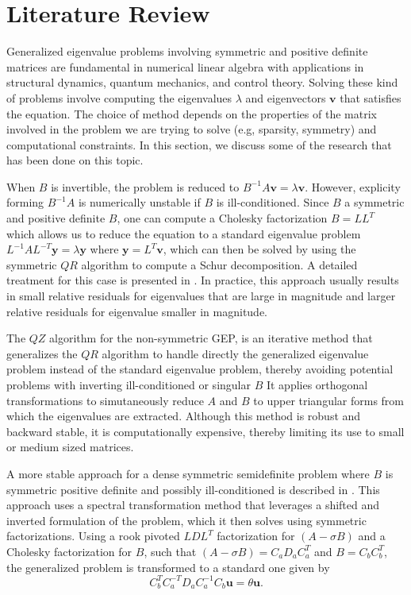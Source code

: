 \section{Literature Review}\label{sec:LiteratureReview}
Generalized eigenvalue problems involving symmetric and positive definite matrices are fundamental in numerical linear algebra with applications in structural  dynamics, quantum mechanics, and control theory. Solving these kind of problems involve computing the eigenvalues $\lambda$ and eigenvectors $\mathbf{v}$ that satisfies the equation. The choice of method depends on the properties of the matrix involved in the problem we are trying to solve (e.g, sparsity, symmetry) and computational constraints. In this section, we discuss some of the research that has been done on this topic.

When $B$ is invertible, the problem is reduced to $B^{-1}A\mathbf{v} = \lambda \mathbf{v}$. However, explicity forming $B^{-1}A$ is numerically unstable if $B$ is ill-conditioned. Since $B$ a symmetric and positive definite $B$, one can compute a Cholesky factorization $B = LL^{T}$ which allows us to reduce the equation to a standard eigenvalue problem $L^{-1}AL^{-T}\mathbf{y} = \lambda \mathbf{y}$ where $\mathbf{y}= L^T \mathbf{v}$, which can then be solved by using the symmetric $QR$ algorithm to compute a Schur decomposition. A detailed treatment for this case is presented in \cite{doi:10.1137/1.9781421407944}. In practice, this approach usually results in small relative residuals for eigenvalues that are large in magnitude and larger relative residuals for eigenvalue smaller in magnitude.

The $QZ$ algorithm \cite{5b3d5fb1-4813-3046-9331-a730b392f611} for the non-symmetric GEP, is an iterative method that generalizes the $QR$ algorithm to handle directly the generalized eigenvalue problem instead of the standard eigenvalue problem, thereby avoiding potential problems with inverting ill-conditioned or singular $B$ It applies orthogonal transformations to simutaneously reduce $A$ and $B$ to upper triangular forms from which the eigenvalues are extracted. Although this method is robust and backward stable, it is computationally expensive, thereby limiting its use to small or medium sized matrices.

A more stable approach for a dense symmetric semidefinite problem where $B$ is symmetric positive definite and possibly ill-conditioned is described in \cite{stewart2024spectraltransformationdensesymmetric}. This approach uses a spectral transformation method that leverages a shifted and inverted formulation of the problem, which it then solves using symmetric factorizations. Using a rook pivoted $LDL^T$ factorization for $(A-\sigma B)$ and a Cholesky factorization for $B$, such that $(A-\sigma B) = C_aD_aC_a^T$ and $B = C_bC_b^T$, the generalized problem is transformed to a standard one given by
\begin{equation}\label{eq:SpectralTrans_With_LDL}
	C_b^TC_a^{-T}D_aC_a^{-1}C_b \mathbf{u} = \theta \mathbf{u}.
\end{equation}

